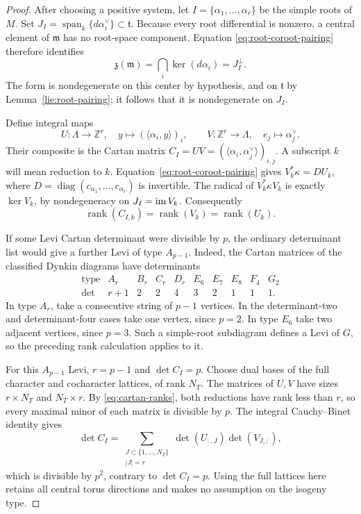 \begin{proof}
After choosing a positive system, let
$I=\{\alpha_1,\ldots,\alpha_r\}$ be the simple roots of $M$.
Set $J_I=\operatorname{span}_k\{d\alpha_i^\vee\}\subset\mathfrak t$.
Because every root differential is nonzero, a central element of
$\mathfrak m$ has no root-space component.  Equation
\eqref{eq:root-coroot-pairing} therefore identifies
\[
 \mathfrak z(\mathfrak m)
   =\bigcap_i\ker(d\alpha_i)=J_I^\perp.
\]
The form is nondegenerate on this center by hypothesis, and on
$\mathfrak t$ by Lemma~\ref{lie:root-pairing}; it follows that it is
nondegenerate on $J_I$.

Define integral maps
\[
 U:\Lambda\longrightarrow\mathbb Z^r,\quad
       y\longmapsto(\langle\alpha_i,y\rangle)_i,
 \qquad
 V:\mathbb Z^r\longrightarrow\Lambda,\quad
       e_j\longmapsto\alpha_j^\vee.
\]
Their composite is the Cartan matrix
$C_I=UV=(\langle\alpha_i,\alpha_j^\vee\rangle)_{i,j}$.
A subscript $k$ will mean reduction to $k$.
Equation~\eqref{eq:root-coroot-pairing} gives
$V_k^*\kappa=D U_k$, where
$D=\operatorname{diag}(c_{\alpha_1},\ldots,c_{\alpha_r})$ is invertible.
The radical of $V_k^*\kappa V_k$ is exactly $\ker V_k$, by
nondegeneracy on $J_I=\operatorname{im} V_k$.  Consequently
\begin{equation}\label{eq:cartan-ranks}
 \operatorname{rank}(C_{I,k})
  =\operatorname{rank}(V_k)=\operatorname{rank}(U_k).
\end{equation}

If some Levi Cartan determinant were divisible by $p$, the ordinary
determinant list would give a further Levi of type $A_{p-1}$.
Indeed, the Cartan matrices of the classified Dynkin diagrams
\cite[Theorem~C.56 and \S24(c)]{Milne} have determinants
\[
 \begin{array}{c|ccccccccc}
 \text{type}&A_r&B_r&C_r&D_r&E_6&E_7&E_8&F_4&G_2\\ \hline
 \det&r+1&2&2&4&3&2&1&1&1.
 \end{array}
\]
In type $A_r$, take a consecutive string of $p-1$ vertices.
In the determinant-two and determinant-four cases take one vertex,
since $p=2$.  In type $E_6$ take two adjacent vertices, since $p=3$.
Such a simple-root subdiagram defines a Levi of $G$, so the preceding
rank calculation applies to it.

For this $A_{p-1}$ Levi, $r=p-1$ and $\det C_I=p$.
Choose dual bases of the full character and cocharacter lattices,
of rank $N_T$.  The matrices of $U,V$ have sizes
$r\times N_T$ and $N_T\times r$.  By
\eqref{eq:cartan-ranks}, both reductions have rank less than $r$,
so every maximal minor of each matrix is divisible by $p$.
The integral Cauchy--Binet identity gives
\[
 \det C_I=
 \sum_{\substack{J\subset\{1,\ldots,N_T\}\\ |J|=r}}
       \det(U_{:,J})\det(V_{J,:}),
\]
which is divisible by $p^2$, contrary to $\det C_I=p$.
Using the full lattices here retains all central torus directions
and makes no assumption on the isogeny type.


\end{proof}

